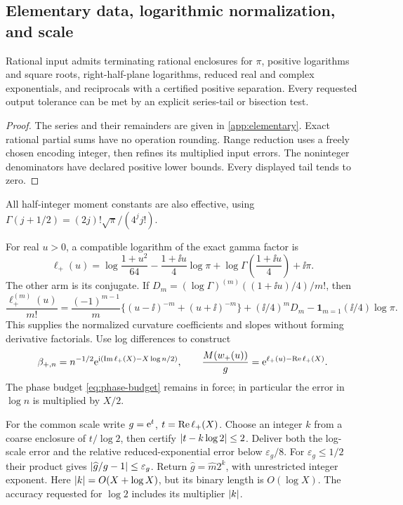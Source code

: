 \subsection{Elementary data, logarithmic normalization, and scale}
\label{subsec:elementary-providers}
\begin{lemma}\label{lem:elementary}
Rational input admits terminating rational enclosures for \(\pi\),
positive logarithms and square roots, right-half-plane logarithms,
reduced real and complex exponentials, and reciprocals with a certified
positive separation. Every requested output tolerance can be met by
an explicit series-tail or bisection test.
\end{lemma}
\begin{proof}
The series and their remainders are given in
\cref{app:elementary}. Exact rational partial sums have no operation
rounding. Range reduction uses a freely chosen encoding integer,
then refines its multiplied input errors. The noninteger denominators
have declared positive lower bounds. Every displayed tail tends to zero.
\end{proof}
All half-integer moment constants are also effective, using
\(\Gamma(j+1/2)=(2j)!\sqrt\pi/(4^jj!)\).

For real \(u>0\), a compatible logarithm of the exact gamma factor is
\begin{equation}
 \ell_+(u)=\log\frac{1+u^2}{64}
       -\frac{1+\ii u}{4}\log\pi
       +\log\Gamma\left(\frac{1+\ii u}{4}\right)+\ii\pi.
 \label{eq:provider-logM}
\end{equation}
The other arm is its conjugate. If
\(D_m=(\log\Gamma)^{(m)}((1+\ii u)/4)/m!\), then
\begin{equation}
 \frac{\ell_+^{(m)}(u)}{m!}
 =\frac{(-1)^{m-1}}m\{(u-\ii)^{-m}+(u+\ii)^{-m}\}
   +(\ii/4)^mD_m-\mathbf1_{m=1}(\ii/4)\log\pi.
 \label{eq:provider-logM-jets}
\end{equation}
This supplies the normalized curvature coefficients and slopes without
forming derivative factorials. Use log differences to construct
\[
 \beta_{+,n}=n^{-1/2}\mathrm e^{\mathrm i(\operatorname{Im}\ell_+(X)-X\log n/2)},\qquad
 \frac{M(w_+(u))}{g}=\mathrm e^{\ell_+(u)-\operatorname{Re}\ell_+(X)}.
\]
The phase budget \eqref{eq:phase-budget} remains in force; in particular
the error in \(\log n\) is multiplied by \(X/2\).

For the common scale write \(g=\mathrm e^t\), \(t=\operatorname{Re}\ell_+(X)\).
Choose an integer \(k\) from a coarse enclosure of \(t/\log2\),
then certify \(\lvert t-k\log2\rvert\le2\). Deliver both the log-scale
error and the relative reduced-exponential error below
\(\varepsilon_g/8\). For \(\varepsilon_g\le1/2\) their product
gives \(\lvert \widehat g/g-1\rvert\le\varepsilon_g\).
Return \(\widehat g=\widehat m2^k\), with unrestricted integer exponent.
Here \(\lvert k\rvert=O(X+\log X)\), but its binary length is \(O(\log X)\).
The accuracy requested for \(\log2\) includes its multiplier \(\lvert k\rvert\).

